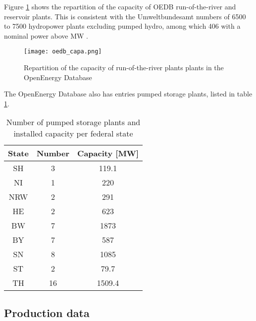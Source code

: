 Figure \ref{oedb_capa} shows the repartition of the capacity of OEDB run-of-the-river and reservoir plants. This is consistent with the Umweltbundesamt numbers of 6500 to 7500 hydropower plants excluding pumped hydro, among which 406 with a nominal power above \unit[1]{MW} \cite{uba_wasserkraft}. 

\begin{figure}[H]
\centering
\texttt{[image: oedb\_capa.png]}
\caption[Repartition of the capacity of run-of-the-river and reservoir plants in the OpenEnergy Database]{Repartition of the capacity of run-of-the-river plants plants in the OpenEnergy Database}
\label{oedb_capa}
\end{figure}

The OpenEnergy Database also has entries pumped storage plants, listed in table \ref{oedb_pump}.

\begin{table}
\footnotesize
  \centering
  \caption[Number of pumped storage plants and installed capacity per federal state]{Number of pumped storage plants and installed capacity per federal state \cite{oedb}}
  \label{oedb_pump}
  \begin{tabular}{|c|cc| }
  \hline
  \textbf{State} & Number 	& 	Capacity [\unit{MW}] 	\\
  \hline
  SH	&	3	&	119.1	\\
  NI	&	1	&	220	\\
  NRW	&	2	&	291	\\
  HE	&	2	&	623	\\
  BW	&	7	&	1873	\\	
  BY	&	7	&	587	\\
  SN	&	8	&	1085	\\
  ST	&	2	&	79.7	\\
  TH	&	16	&	1509.4	\\
  \hline
  \end{tabular}
\end{table}

\subsection{Production data}
\label{sub:prod_data}

